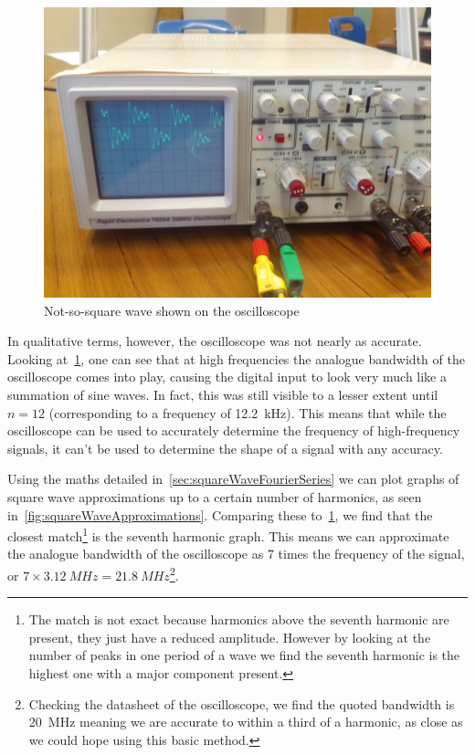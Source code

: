 \begin{figure}[h]
  \includegraphics[width=\textwidth]{img/experiments/scope/wave.jpg}
  \caption{Not-so-square wave shown on the oscilloscope}
  \label{fig:oscilloscopeTestWave}
\end{figure}

In qualitative terms, however, the oscilloscope was not nearly as accurate.
Looking at~\cref{fig:oscilloscopeTestWave}, one can see that at high frequencies the analogue
bandwidth of the oscilloscope comes into play, causing the digital input to look
very much like a summation of sine waves. In fact, this was still visible to a
lesser extent until $n=12$ (corresponding to a frequency of \SI{12.2}{\kHz}).
This means that while the oscilloscope can be used to accurately determine the
frequency of high-frequency signals, it can't be used to determine the shape of
a signal with any accuracy.

Using the maths detailed in~\cref{sec:squareWaveFourierSeries} we can plot
graphs of square wave approximations up to a certain number of harmonics, as
seen in~\cref{fig:squareWaveApproximations}. Comparing these
to~\cref{fig:oscilloscopeTestWave}, we find that the closest match\footnote{The
  match is not exact because harmonics above the seventh harmonic are present,
  they just have a reduced amplitude.  However by looking at the number of peaks
  in one period of a wave we find the seventh harmonic is the highest one with a
  major component present.} is the seventh harmonic graph. This means we can
  approximate the analogue bandwidth of the oscilloscope as 7 times the
  frequency of the signal, or
  $7\times\SI{3.12}{MHz}=\SI{21.8}{MHz}$\footnote{Checking the datasheet of the
  oscilloscope, we find the quoted bandwidth is \SI{20}{MHz} meaning we are
accurate to within a third of a harmonic, as close as we could hope using this
basic method.}.

